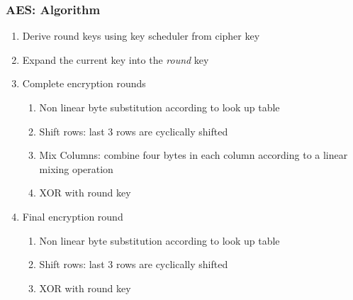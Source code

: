 \documentclass{beamer}
\begin{document}
\begin{frame}
    \frametitle{AES: Algorithm}
    \begin{enumerate}
        \item \pause Derive round keys using key scheduler from cipher key \pause
        \item Expand the current key into the \textit{round} key \pause
        \item Complete encryption rounds \pause
        \begin{enumerate}
            \item Non linear byte substitution according to look up table\pause
            \item Shift rows: last 3 rows are cyclically shifted\pause
            \item Mix Columns: combine four bytes in each column according to a linear mixing operation\pause
            \item XOR with round key
        \end{enumerate}
        \item Final encryption round\pause
        \begin{enumerate}
            \item Non linear byte substitution according to look up table\pause
            \item Shift rows: last 3 rows are cyclically shifted\pause
            \item XOR with round key\pause
        \end{enumerate}
    \end{enumerate}
\end{frame}
\end{document}
